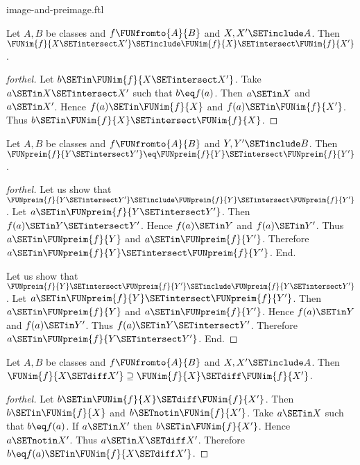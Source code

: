 \documentclass{naproche-library}
\begin{document}
\begin{smodule}[title=Computation Laws for Images and Preimages]{image-and-preimage.ftl}
\begin{proposition}[forthel,id=FOUNDATIONS_07_3966130473402368]
  Let $A, B$ be classes and $f \FUNfromto{A}{B}$ and $X, X' \SETinclude A$.
  Then $\FUNim{f}{X \SETintersect X'} \SETinclude \FUNim{f}{X} \SETintersect \FUNim{f}{X'}$.
\end{proposition}
\begin{proof}[forthel]
  Let $b \SETin \FUNim{f}{X \SETintersect X'}$.
  Take $a \SETin X \SETintersect X'$ such that $b \eq f(a)$.
  Then $a \SETin X$ and $a \SETin X'$.
  Hence $f(a) \SETin \FUNim{f}{X}$ and $f(a) \SETin \FUNim{f}{X'}$.
  Thus $b \SETin \FUNim{f}{X} \SETintersect \FUNim{f}{X}$.
\end{proof}

\begin{proposition}[forthel,id=FOUNDATIONS_07_4021844428455936]
  Let $A, B$ be classes and $f \FUNfromto{A}{B}$ and $Y, Y' \SETinclude B$.
  Then $\FUNpreim{f}{Y \SETintersect Y'} \eq \FUNpreim{f}{Y} \SETintersect \FUNpreim{f}{Y'}$.
\end{proposition}
\begin{proof}[forthel]
  Let us show that $\FUNpreim{f}{Y \SETintersect Y'} \SETinclude \FUNpreim{f}{Y} \SETintersect \FUNpreim{f}{Y'}$.
    Let $a \SETin \FUNpreim{f}{Y \SETintersect Y'}$.
    Then $f(a) \SETin Y \SETintersect Y'$.
    Hence $f(a) \SETin Y$ and $f(a) \SETin Y'$.
    Thus $a \SETin \FUNpreim{f}{Y}$ and $a \SETin \FUNpreim{f}{Y'}$.
    Therefore $a \SETin \FUNpreim{f}{Y} \SETintersect \FUNpreim{f}{Y'}$.
  End.

  Let us show that $\FUNpreim{f}{Y} \SETintersect \FUNpreim{f}{Y'} \SETinclude \FUNpreim{f}{Y \SETintersect Y'}$.
    Let $a \SETin \FUNpreim{f}{Y} \SETintersect \FUNpreim{f}{Y'}$.
    Then $a \SETin \FUNpreim{f}{Y}$ and $a \SETin \FUNpreim{f}{Y'}$.
    Hence $f(a) \SETin Y$ and $f(a) \SETin Y'$.
    Thus $f(a) \SETin Y \SETintersect Y'$.
    Therefore $a \SETin \FUNpreim{f}{Y \SETintersect Y'}$.
  End.
\end{proof}

\begin{proposition}[forthel,id=FOUNDATIONS_07_8372256617005056]
  Let $A, B$ be classes and $f \FUNfromto{A}{B}$ and $X, X' \SETinclude A$.
  Then $\FUNim{f}{X \SETdiff X'} \supseteq \FUNim{f}{X} \SETdiff \FUNim{f}{X'}$.
\end{proposition}
\begin{proof}[forthel]
  Let $b \SETin \FUNim{f}{X} \SETdiff \FUNim{f}{X'}$.
  Then $b \SETin \FUNim{f}{X}$ and $b \SETnotin \FUNim{f}{X'}$.
  Take $a \SETin X$ such that $b \eq f(a)$.
  If $a \SETin X'$ then $b \SETin \FUNim{f}{X'}$.
  Hence $a \SETnotin X'$.
  Thus $a \SETin X \SETdiff X'$.
  Therefore $b \eq f(a) \SETin \FUNim{f}{X \SETdiff X'}$.
\end{proof}


\end{smodule}
\end{document}
